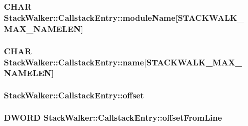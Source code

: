 \hypertarget{struct_stack_walker_1_1_callstack_entry_a79589ee14ad3c43520714d08b2b04dc1}{
\subsubsection[{module\-Name}]{\setlength{\rightskip}{0pt plus 5cm}C\-H\-A\-R Stack\-Walker\-::\-Callstack\-Entry\-::module\-Name\mbox{[}{\bf S\-T\-A\-C\-K\-W\-A\-L\-K\-\_\-\-M\-A\-X\-\_\-\-N\-A\-M\-E\-L\-E\-N}\mbox{]}}}\label{struct_stack_walker_1_1_callstack_entry_a79589ee14ad3c43520714d08b2b04dc1}
\hypertarget{struct_stack_walker_1_1_callstack_entry_a645c2afec348019287eb2913cca59b94}{
\subsubsection[{name}]{\setlength{\rightskip}{0pt plus 5cm}C\-H\-A\-R Stack\-Walker\-::\-Callstack\-Entry\-::name\mbox{[}{\bf S\-T\-A\-C\-K\-W\-A\-L\-K\-\_\-\-M\-A\-X\-\_\-\-N\-A\-M\-E\-L\-E\-N}\mbox{]}}}\label{struct_stack_walker_1_1_callstack_entry_a645c2afec348019287eb2913cca59b94}
\hypertarget{struct_stack_walker_1_1_callstack_entry_aa6cecf3032065d37a0e2891dc1b90d39}{
\subsubsection[{offset}]{ Stack\-Walker\-::\-Callstack\-Entry\-::offset}}\label{struct_stack_walker_1_1_callstack_entry_aa6cecf3032065d37a0e2891dc1b90d39}
\hypertarget{struct_stack_walker_1_1_callstack_entry_a1fc963b2492073e1ae10699dfc200cf4}{
\subsubsection[{offset\-From\-Line}]{\setlength{\rightskip}{0pt plus 5cm}D\-W\-O\-R\-D Stack\-Walker\-::\-Callstack\-Entry\-::offset\-From\-Line}}\label{struct_stack_walker_1_1_callstack_entry_a1fc963b2492073e1ae10699dfc200cf4}
